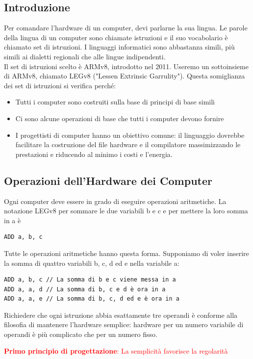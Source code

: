 \documentclass[12pt,a4paper]{article}
\begin{document}
\subsection{Introduzione}
Per comandare l'hardware di un computer, devi parlarne la sua lingua. Le parole della lingua di un computer sono chiamate istruzioni e il suo vocabolario è chiamato set di istruzioni. I linguaggi informatici sono abbastanza simili, più simili ai dialetti regionali che alle lingue indipendenti.\\
Il set di istruzioni scelto è ARMv8, introdotto nel 2011. Useremo un sottoinsieme di ARMv8, chiamato LEGv8  ("Lessen Extrinsic Garrulity"). Questa somiglianza dei set di istruzioni si verifica perché:
\begin{itemize}
\item Tutti i computer sono costruiti sulla base di principi di base simili
\item Ci sono alcune operazioni di base che tutti i computer devono fornire
\item I progettisti di computer hanno un obiettivo comune: il linguaggio dovrebbe facilitare la costruzione del file hardware e il compilatore massimizzando le prestazioni e riducendo al minimo i costi e l'energia.
\end{itemize}

\subsection{Operazioni dell'Hardware dei Computer}
Ogni computer deve essere in grado di eseguire operazioni aritmetiche. La notazione LEGv8 per sommare le due variabili b e c e per mettere la loro somma in a è 
\begin{center}
\begin{minipage}{.2\linewidth}
\begin{verbatim}
ADD a, b, c
\end{verbatim}
\end{minipage}
\end{center}
Tutte le operazioni aritmetiche hanno questa forma. Supponiamo di voler inserire la somma di quattro variabili b, c, d ed e nella variabile a:
\begin{verbatim}
ADD a, b, c // La somma di b e c viene messa in a
ADD a, a, d // La somma di b, c e d è ora in a
ADD a, a, e // La somma di b, c, d ed e è ora in a
\end{verbatim}
Richiedere che ogni istruzione abbia esattamente tre operandi è conforme alla filosofia di mantenere l'hardware semplice: hardware per un numero variabile di operandi è più complicato che per un numero fisso.\\
\begin{center}\textcolor{red}{\textbf{Primo principio di progettazione}: La semplicità favorisce la regolarità}\end{center}
\end{document}
